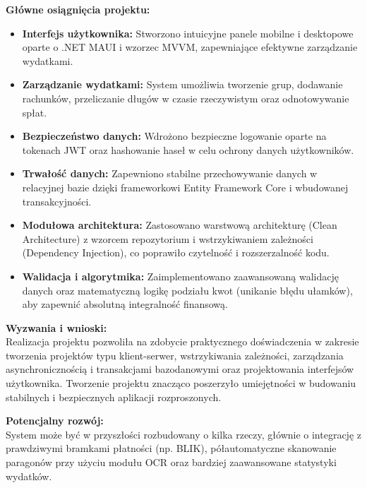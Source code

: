 \documentclass[12pt, a4paper]{article}
\begin{document}
\textbf{Główne osiągnięcia projektu:}
\begin{itemize}
    \item \textbf{Interfejs użytkownika:} Stworzono intuicyjne panele mobilne i desktopowe oparte o .NET MAUI i wzorzec MVVM, zapewniające efektywne zarządzanie wydatkami.
    \item \textbf{Zarządzanie wydatkami:} System umożliwia tworzenie grup, dodawanie rachunków, przeliczanie długów w czasie rzeczywistym oraz odnotowywanie spłat.
    \item \textbf{Bezpieczeństwo danych:} Wdrożono bezpieczne logowanie oparte na tokenach JWT oraz hashowanie haseł w celu ochrony danych użytkowników.
    \item \textbf{Trwałość danych:} Zapewniono stabilne przechowywanie danych w relacyjnej bazie dzięki frameworkowi Entity Framework Core i wbudowanej transakcyjności.
    \item \textbf{Modułowa architektura:} Zastosowano warstwową architekturę (Clean Architecture) z wzorcem repozytorium i wstrzykiwaniem zależności (Dependency Injection), co poprawiło czytelność i rozszerzalność kodu.
    \item \textbf{Walidacja i algorytmika:} Zaimplementowano zaawansowaną walidację danych oraz matematyczną logikę podziału kwot (unikanie błędu ułamków), aby zapewnić absolutną integralność finansową.
\end{itemize}

\textbf{Wyzwania i wnioski:} \\
Realizacja projektu pozwoliła na zdobycie praktycznego doświadczenia w zakresie tworzenia projektów typu klient-serwer, wstrzykiwania zależności, zarządzania asynchronicznością i transakcjami bazodanowymi oraz projektowania interfejsów użytkownika. Tworzenie projektu znacząco poszerzyło umiejętności w budowaniu stabilnych i bezpiecznych aplikacji rozproszonych.

\textbf{Potencjalny rozwój:} \\
System może być w przyszłości rozbudowany o kilka rzeczy, głównie o integrację z prawdziwymi bramkami płatności (np. BLIK), półautomatyczne skanowanie paragonów przy użyciu modułu OCR oraz bardziej zaawansowane statystyki wydatków.
\end{document}
